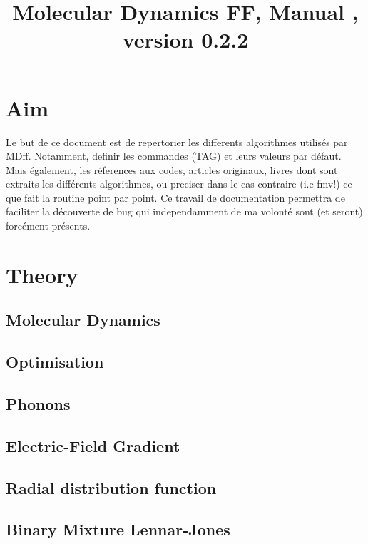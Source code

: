 \documentclass[a4paper]{article}
\title{Molecular Dynamics FF, Manual , version 0.2.2}
\newcommand{\MDFF}{{\sc MDff}}
\newcommand{\FMV}{{\sc fmv}}
\begin{document}
\maketitle
\clearpage
\tableofcontents

\clearpage

\section{Aim}

Le but de ce document est de repertorier les differents 
algorithmes utilis\'es par \MDFF. Notamment, definir les 
commandes (TAG) et leurs valeurs par défaut. Mais également, 
les r\'eferences aux codes, articles originaux, livres dont 
sont extraits les diff\'erents algorithmes, ou preciser dans 
le cas contraire (i.e \FMV!) ce que fait la routine point par point. 
Ce travail de documentation permettra de faciliter la d\'ecouverte
de bug qui independamment de ma volont\'e sont (et seront) 
forc\'ement pr\'esents. 

\clearpage

\section{Theory}

\subsection{Molecular Dynamics\label{sec:MD}}

\subsection{Optimisation\label{sec:OPT}}

\subsection{Phonons\label{sec:VIB}}

\subsection{Electric-Field Gradient\label{sec:EFG}}

\subsection{Radial distribution function\label{sec:GR}}

\subsection{Binary Mixture Lennar-Jones\label{sec:BMLJ}}
\end{document}
